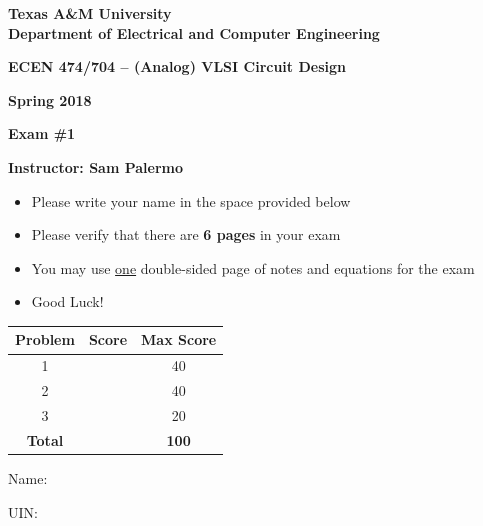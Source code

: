\begingroup
{}
\vspace*{1.0in}
\begin{center}
{\sffamily\bfseries\fontsize{16}{20}\selectfont
Texas A\&M University\\
Department of Electrical and Computer Engineering\par}
\vspace{.40in}
{\sffamily\bfseries\fontsize{15}{18}\selectfont
ECEN 474/704 -- (Analog) VLSI Circuit Design\par}
\vspace{.38in}
{\sffamily\bfseries\fontsize{16}{19}\selectfont Spring 2018\par}
\vspace{.30in}
{\sffamily\bfseries\fontsize{16}{19}\selectfont Exam \#1\par}
\vspace{.30in}
{\sffamily\bfseries\fontsize{16}{19}\selectfont Instructor: Sam Palermo\par}
\end{center}
\vspace{.42in}
\begin{itemize}[leftmargin=.3in,itemsep=1pt,topsep=0pt]
\item Please write your name in the space provided below
\item Please verify that there are \textbf{6 pages} in your exam
\item You may use \underline{one} double-sided page of notes and equations for the exam
\item Good Luck!
\end{itemize}
\vspace{.65in}
\begin{tabular}{|c|c|c|}\hline
Problem&Score&Max Score\\\hline
1&&40\\\hline
2&&40\\\hline
3&&20\\\hline
\textbf{Total}&&\textbf{100}\\\hline
\end{tabular}
\vfill
Name: \hrulefill\par
\vspace{7pt}
UIN: \hrulefill
\vspace{.12in}

